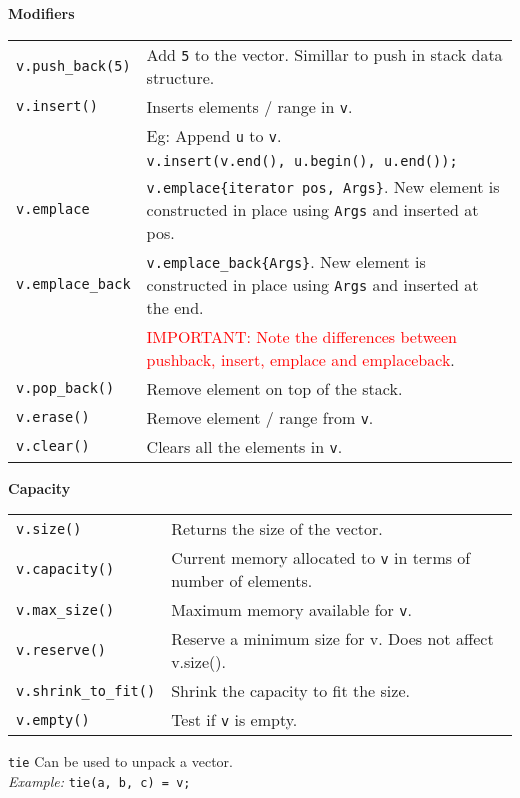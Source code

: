 \textbf{Modifiers}

\begin{tabularx}{\linewidth}{lX}
\texttt{v.push\_back(5)} & Add \texttt{5} to the vector. Simillar to push in stack data structure.\\
\texttt{v.insert()} & Inserts elements / range in \texttt{v}.\\
& Eg: Append \texttt{u} to \texttt{v}.\\
& \texttt{v.insert(v.end(), u.begin(), u.end());}\\
\texttt{v.emplace} & \texttt{v.emplace\{iterator pos, Args\}}. New element is constructed in place using \texttt{Args} and inserted at pos.\\
\texttt{v.emplace\_back} & \texttt{v.emplace\_back\{Args\}}. New element is constructed in place using \texttt{Args} and inserted at the end.\\
& \textcolor{red}{IMPORTANT: Note the differences between pushback, insert, emplace and emplaceback}.\\
\texttt{v.pop\_back()} & Remove element on top of the stack.\\
\texttt{v.erase()} & Remove element / range from \texttt{v}.\\
\texttt{v.clear()} & Clears all the elements in \texttt{v}.\\
\end{tabularx}

\textbf{Capacity}

\begin{tabularx}{\linewidth}{lX}
\texttt{v.size()} & Returns the size of the vector.\\
\texttt{v.capacity()} & Current memory allocated to \texttt{v} in terms of number of elements.\\
\texttt{v.max\_size()} & Maximum memory available for \texttt{v}.\\
\texttt{v.reserve()} & Reserve a minimum size for v. Does not affect v.size().\\
\texttt{v.shrink\_to\_fit()} & Shrink the capacity to fit the size.\\
\texttt{v.empty()} & Test if \texttt{v} is empty.\\
\end{tabularx}

\vspace*{8pt}
\texttt{tie} Can be used to unpack a vector.\\
\textit{Example:} \texttt{tie(a, b, c) = v;}\\


